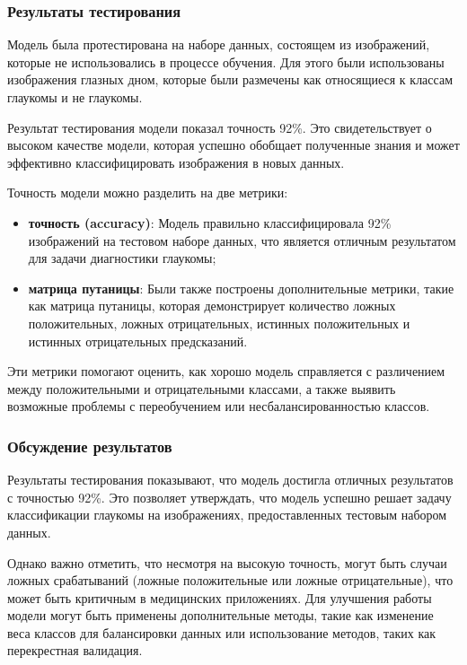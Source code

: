 {    \subsubsection*{Результаты тестирования}

    Модель была протестирована на наборе данных, состоящем из изображений, которые не использовались в процессе обучения. Для этого были использованы изображения глазных дном, которые были размечены как относящиеся к классам глаукомы и не глаукомы.

    Результат тестирования модели показал точность 92\%. Это свидетельствует о высоком качестве модели, которая успешно обобщает полученные знания и может эффективно классифицировать изображения в новых данных.

    Точность модели можно разделить на две метрики:
    \begin{itemize}
        \item \textbf{точность (accuracy)}: Модель правильно классифицировала 92\% изображений на тестовом наборе данных, что является отличным результатом для задачи диагностики глаукомы;
        \item \textbf{матрица путаницы}: Были также построены дополнительные метрики, такие как матрица путаницы, которая демонстрирует количество ложных положительных, ложных отрицательных, истинных положительных и истинных отрицательных предсказаний.
    \end{itemize}

    Эти метрики помогают оценить, как хорошо модель справляется с различением между положительными и отрицательными классами, а также выявить возможные проблемы с переобучением или несбалансированностью классов.

    \subsubsection*{Обсуждение результатов}

    Результаты тестирования показывают, что модель достигла отличных результатов с точностью 92\%. Это позволяет утверждать, что модель успешно решает задачу классификации глаукомы на изображениях, предоставленных тестовым набором данных.

    Однако важно отметить, что несмотря на высокую точность, могут быть случаи ложных срабатываний (ложные положительные или ложные отрицательные), что может быть критичным в медицинских приложениях. Для улучшения работы модели могут быть применены дополнительные методы, такие как изменение веса классов для балансировки данных или использование методов, таких как перекрестная валидация.

}
